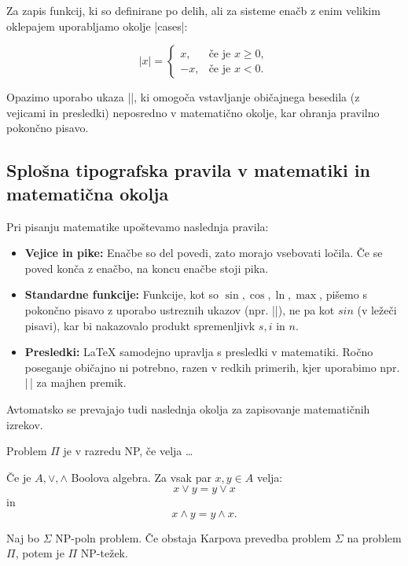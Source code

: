 \documentclass[9pt]{style/friteza}
\begin{document}
Za zapis funkcij, ki so definirane po delih, ali za sisteme enačb z enim velikim oklepajem uporabljamo okolje \ltx|cases|:

\begin{equation}
    |x| = \begin{cases}
        x,  & \text{če je } x \ge 0, \\
        -x, & \text{če je } x < 0.
    \end{cases}
\end{equation}

Opazimo uporabo ukaza \ltx||, ki omogoča vstavljanje običajnega besedila (z vejicami in presledki) neposredno v matematično okolje, kar ohranja pravilno pokončno pisavo.

\subsection{Splošna tipografska pravila v matematiki in matematična okolja}

Pri pisanju matematike upoštevamo naslednja pravila:
\begin{itemize}
    \item \textbf{Vejice in pike:} Enačbe so del povedi, zato morajo vsebovati ločila. Če se poved konča z enačbo, na koncu enačbe stoji pika.
    \item \textbf{Standardne funkcije:} Funkcije, kot so $\sin, \cos, \ln, \max$, pišemo s pokončno pisavo z uporabo ustreznih ukazov (npr. \ltx|\sin|), ne pa kot $sin$ (v ležeči pisavi), kar bi nakazovalo produkt spremenljivk $s, i$ in $n$.
    \item \textbf{Presledki:} \LaTeX{} samodejno upravlja s presledki v matematiki. Ročno poseganje običajno ni potrebno, razen v redkih primerih, kjer uporabimo npr. \ltx|\,| za majhen premik.
\end{itemize}

Avtomatsko se prevajajo tudi naslednja okolja za zapisovanje matematičnih izrekov.

\begin{definition}
Problem $\Pi$ je v razredu NP, če velja \dots
\end{definition}

\begin{axiom}
Če je ${A, \vee, \wedge}$ Boolova algebra.
Za vsak par $x, y \in A$ velja: \[x \vee y = y \vee x\] in \[x \wedge y = y \wedge x.\]
\end{axiom}

\begin{proposition}
Naj bo $\Sigma$ NP-poln problem.
Če obstaja Karpova prevedba problem $\Sigma$ na problem $\Pi$, potem je $\Pi$ NP-težek.
\end{proposition}
\end{document}
